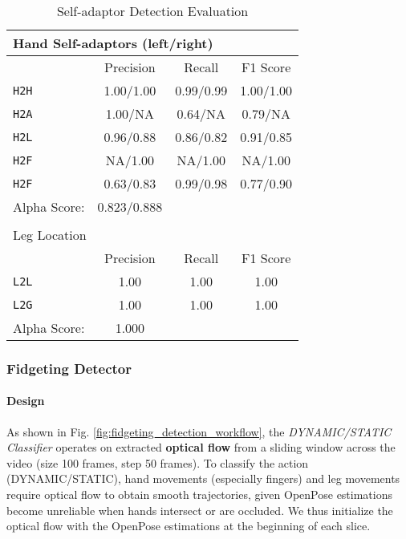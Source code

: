\begin{table}[!htbp]
\centering
\begin{tabular}{lccc}
\multicolumn{4}{l}{Hand Self-adaptors (left/right)}\\
\toprule
 & Precision & Recall & F1 Score \\
\midrule
\texttt{H2H} & 1.00/1.00 & 0.99/0.99 & 1.00/1.00 \\
\texttt{H2A} & 1.00/NA & 0.64/NA & 0.79/NA \\
\texttt{H2L} & 0.96/0.88 & 0.86/0.82 & 0.91/0.85 \\
\texttt{H2F} & NA/1.00 & NA/1.00 & NA/1.00 \\
\texttt{H2F} & 0.63/0.83 & 0.99/0.98 & 0.77/0.90\\
\midrule
Alpha Score: & 0.823/0.888 \\
\bottomrule
\\
\multicolumn{4}{l}{Leg Location}\\
\toprule
{} & Precision & Recall & F1 Score \\
\midrule
\texttt{L2L} & 1.00 & 1.00 & 1.00\\
\texttt{L2G} & 1.00 & 1.00 & 1.00 \\
\midrule
Alpha Score: & 1.000 \\
\bottomrule
\end{tabular}
\vspace{0.2cm}
\caption{Self-adaptor Detection Evaluation}
\vspace{-5mm}
\label{tab:location_detector_evaluation}
\end{table}

\subsubsection{Fidgeting Detector} \label{sec:Fidgeting_Detector}
\paragraph{Design}








As shown in Fig. \ref{fig:fidgeting_detection_workflow}, the \textit{DYNAMIC/STATIC Classifier} operates on extracted \textbf{optical flow} from a sliding window across the video (size 100 frames, step 50 frames).
To classify the action (DYNAMIC/STATIC), hand movements (especially fingers) and leg movements require optical flow to obtain smooth trajectories, given OpenPose estimations become unreliable when hands intersect or are occluded. We thus initialize the optical flow with the OpenPose estimations at the beginning of each slice.


